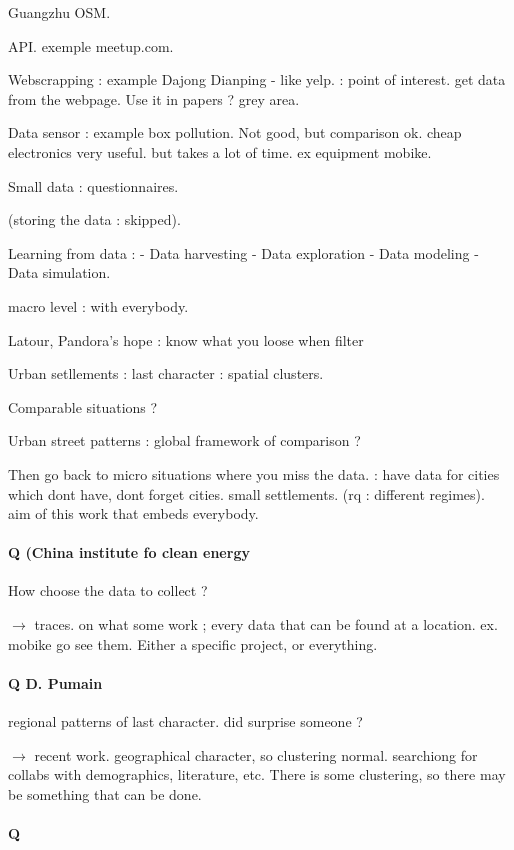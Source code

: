 Guangzhu OSM.

API. exemple meetup.com.

Webscrapping : example Dajong Dianping - like yelp. : point of interest. get data from the webpage. Use it in papers ? grey area.

Data sensor : example box pollution. Not good, but comparison ok. cheap electronics very useful. but takes a lot of time. ex equipment mobike.

Small data : questionnaires.

(storing the data : skipped).

Learning from data : 
 - Data harvesting
 - Data exploration
 - Data modeling
 - Data simulation.
 
macro level : with everybody.

Latour, Pandora's hope : know what you loose when filter

Urban setllements : last character : spatial clusters.

Comparable situations ?

Urban street patterns : global framework of comparison ?

Then go back to micro situations where you miss the data. : have data for cities which dont have, dont forget cities. small settlements. (rq : different regimes).
aim of this work that embeds everybody.


\paragraph{Q (China institute fo clean energy} 

How choose the data to collect ?

$\rightarrow$ traces. on what some work ; every data that can be found at a location. ex. mobike go see them. Either a specific project, or everything.

\paragraph{Q D. Pumain}

regional patterns of last character.
did surprise someone ?

$\rightarrow$ recent work. geographical character, so clustering normal. searchiong for collabs with demographics, literature, etc. There is some clustering, so there may be something that can be done.

\paragraph{Q}

